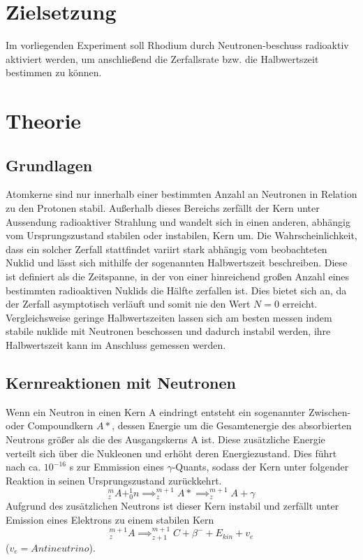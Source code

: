 \documentclass{scrartcl}
\begin{document}
\section{Zielsetzung}
Im vorliegenden Experiment soll Rhodium durch Neutronen-beschuss radioaktiv aktiviert werden, um anschließend die Zerfallsrate bzw. die Halbwertszeit bestimmen zu können.
\section{Theorie}
\subsection{Grundlagen}
Atomkerne sind nur innerhalb einer bestimmten Anzahl an Neutronen in Relation zu den Protonen stabil. Außerhalb dieses Bereichs zerfällt der Kern unter Aussendung radioaktiver Strahlung und wandelt sich in einen anderen, abhängig vom Ursprungszustand stabilen oder instabilen, Kern um. Die Wahrscheinlichkeit, dass ein solcher Zerfall stattfindet variirt stark abhängig vom beobachteten Nuklid und lässt sich mithilfe der sogenannten Halbwertszeit beschreiben. Diese ist definiert als die Zeitspanne, in der von einer hinreichend großen Anzahl eines bestimmten radioaktiven Nuklids die Hälfte zerfallen ist. Dies bietet sich an, da der Zerfall asymptotisch verläuft und somit nie den Wert $N=0$ erreicht. Vergleichsweise geringe Halbwertszeiten lassen sich am besten messen indem stabile nuklide mit Neutronen beschossen und dadurch instabil werden, ihre Halbwertszeit kann im Anschluss gemessen werden.
\subsection{Kernreaktionen mit Neutronen}
Wenn ein Neutron in einen Kern A eindringt entsteht ein sogenannter Zwischen- oder Compoundkern $A*$, dessen Energie um die Gesamtenergie des absorbierten Neutrons größer als die des Ausgangskerns A ist.  Diese zusätzliche Energie verteilt sich über die Nukleonen und erhöht deren Energiezustand. Dies führt nach ca. $10^{-16}$ s zur Emmission eines $\gamma$-Quants, sodass der Kern unter folgender Reaktion in seinen Ursprungszustand zurückkehrt.
\begin{equation*}
^m_zA + ^1_0n \implies ^{m+1}_zA* \implies ^{m+1}_z A+ \gamma
\end{equation*}
Aufgrund des zusätzlichen Neutrons ist dieser Kern instabil und zerfällt unter Emission eines Elektrons zu einem stabilen Kern
\begin{equation*}
^{m+1}_z A \implies  ^{m+1}_{z+1} C + \beta^- + E_{kin} + v_e
\end{equation*}
($v_e = Antineutrino$).
\end{document}

